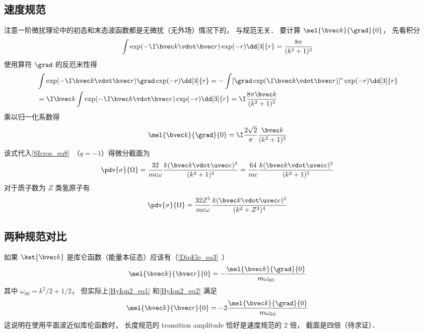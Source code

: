 \subsection{速度规范}
注意一阶微扰理论中的初态和末态波函数都是无微扰（无外场）情况下的， 与规范无关． 要计算 $\mel{\bvec k}{\grad}{0}$， 先看积分
\begin{equation}
\int \exp(-\I \bvec k \vdot \bvec r) \exp(-r) \dd[3]{r} = \frac{8\pi }{(k^2 + 1)^2}
\end{equation}
使用算符 $\grad$ 的反厄米性得
\begin{equation}
\begin{aligned}
&\int \exp(-\I \bvec k \vdot \bvec r) \grad \exp(-r) \dd[3]{r}
= -\int [\grad \exp(\I \bvec k \vdot \bvec r)]^* \exp(-r) \dd[3]{r}\\
&= \I \bvec k \int \exp(-\I \bvec k \vdot \bvec r) \exp(-r) \dd[3]{r}
= \I \frac{8 \pi  \bvec k}{(k^2 + 1)^2}
\end{aligned}
\end{equation}
乘以归一化系数得
\begin{equation}\label{HyIon2_eq2}
\mel{\bvec k}{\grad}{0} = \I\frac{2\sqrt{2}}{\pi}\frac{\bvec k}{(k^2 + 1)^2}
\end{equation}
该式代入\autoref{SIcros_eq8}~（$q = -1$）得微分截面为
\begin{equation}
\pdv{\sigma}{\Omega} = \frac{32}{mc\omega} \frac{k(\bvec k \vdot \uvec e)^2}{(k^2 + 1)^4}
= \frac{64}{mc} \frac{k(\bvec k \vdot \uvec e)^2}{(k^2 + 1)^5}
\end{equation}
对于质子数为 $Z$ 类氢原子有
\begin{equation}
\pdv{\sigma}{\Omega} = \frac{32 Z^5}{mc\omega} \frac{k(\bvec k \vdot \uvec e)^2}{(k^2 + Z^2)^4}
\end{equation}

\subsection{两种规范对比}
如果 $\ket{\bvec k}$ 是库仑函数（能量本征态）应该有（\autoref{DipEle_eq3}~）
\begin{equation}
\mel{\bvec k}{\bvec r}{0} = -\frac{\mel{\bvec k}{\grad}{0}}{m\omega_{k0}}
\end{equation}
其中 $\omega_{k0} = k^2/2 + 1/2$， 但实际上\autoref{HyIon2_eq1} 和\autoref{HyIon2_eq2} 满足
\begin{equation}
\mel{\bvec k}{\bvec r}{0} = -2\frac{\mel{\bvec k}{\grad}{0}}{m\omega_{k0}}
\end{equation}
这说明在使用平面波近似库伦函数时， 长度规范的 transition amplitude 恰好是速度规范的 2 倍， 截面是四倍（待求证）．

